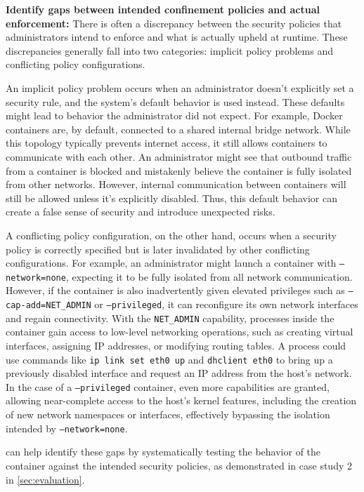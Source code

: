 \noindent\textbf{Identify gaps between intended confinement policies and actual enforcement:}
There is often a discrepancy between the security policies that administrators intend to enforce and what is actually upheld at runtime. These discrepancies generally fall into two categories: implicit policy problems and conflicting policy configurations.

An implicit policy problem occurs when an administrator doesn't explicitly set a security rule, and the system's default behavior is used instead. These defaults might lead to behavior the administrator did not expect. For example, Docker containers are, by default, connected to a shared internal bridge network. While this topology typically prevents internet access, it still allows containers to communicate with each other. An administrator might see that outbound traffic from a container is blocked and mistakenly believe the container is fully isolated from other networks. However, internal communication between containers will still be allowed unless it's explicitly disabled. Thus, this default behavior can create a false sense of security and introduce unexpected risks.

A conflicting policy configuration, on the other hand, occurs when a security policy is correctly specified but is later invalidated by other conflicting configurations. For example, an administrator might launch a container with \texttt{--network=none}, expecting it to be fully isolated from all network communication. However, if the container is also inadvertently given elevated privileges such as \texttt{--cap-add=NET\_ADMIN} or \texttt{--privileged}, it can reconfigure its own network interfaces and regain connectivity. With the \texttt{NET\_ADMIN} capability, processes inside the container gain access to low-level networking operations, such as creating virtual interfaces, assigning IP addresses, or modifying routing tables. A process could use commands like \texttt{ip link set eth0 up} and \texttt{dhclient eth0} to bring up a previously disabled interface and request an IP address from the host’s network. In the case of a \texttt{--privileged} container, even more capabilities are granted, allowing near-complete access to the host's kernel features, including the creation of new network namespaces or interfaces, effectively bypassing the isolation intended by \texttt{--network=none}.

\houdini can help identify these gaps by systematically testing the behavior of the container against the intended security policies, as demonstrated in case study 2 in \cref{sec:evaluation}.

